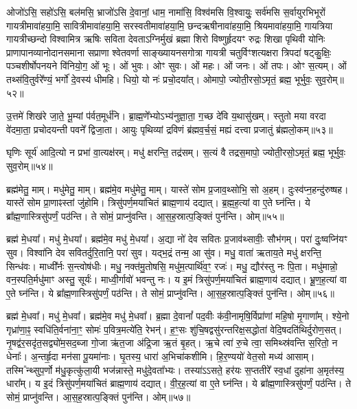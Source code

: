ओजो॑ऽसि॒ सहो॑ऽसि॒ बल॑मसि॒ भ्राजो॑ऽसि दे॒वानां॒ धाम॒ नामा॑सि॒ विश्व॑मसि वि॒श्वायुः॒ सर्व॑मसि स॒र्वायुरभिभूरों गायत्रीमावा॑हया॒मि॒ सावित्रीमावा॑हया॒मि॒ सरस्वतीमावा॑ह\-या॒मि॒ छन्दऋषीनावा॑हया॒मि॒ श्रियमावा॑हया॒मि॒ गायत्रिया गायत्रीच्छन्दो विश्वामित्र ऋषिः सविता देवताऽग्निर्मुखं ब्रह्मा शिरो विष्णुर्\mbox{}हृदयꣳ रुद्रः शिखा पृथिवी योनिः प्राणापानव्यानोदानसमाना सप्राणा श्वेतवर्णा साङ्ख्यायनसगोत्रा गायत्री चतुर्विꣳशत्यक्षरा त्रिपदा॑ षट्कु॒क्षिः॒ पञ्चशीर्\mbox{}षोपनयने वि॑नियो॒ग॒ ओं भूः। 
ओं भुवः। 
ओꣳ सुवः। 
ओं महः। 
ओं जनः। 
ओं तपः। 
ओꣳ स॒त्यम्। 
ओं तथ्स॑वि॒तुर्वरे᳚ण्यं॒ भर्गो॑ दे॒वस्य॑ धीमहि। 
धियो॒ यो नः॑ प्रचो॒दया᳚त्। 
ओमापो॒ ज्योती॒रसो॒ऽमृतं॒ ब्रह्म॒ भूर्भुवः॒ सुव॒रोम्॥५२॥
\anuvakamend

उ॒त्तमे॑ शिख॑रे जा॒ते॒ भू॒म्यां प॑र्वत॒मूर्ध॑नि। 
ब्रा॒ह्म॒णे᳚भ्योऽभ्य॑नु\-ज्ञा॒ता॒ ग॒च्छ दे॑वि य॒थासु॑खम्। 
स्तुतो मया वरदा वे॑दमा॒ता॒ प्रचोदयन्ती पवने᳚ द्विजा॒ता। 
आयुः पृथिव्यां द्रविणं ब्र॑ह्मव॒र्च॒सं॒ मह्यं दत्त्वा प्रजातुं ब्र॑ह्मलो॒कम्॥५३॥
\anuvakamend

घृणिः सूर्य॑ आदि॒त्यो न प्रभा॑ वा॒त्यक्ष॑रम्। 
मधु॑ क्षरन्ति॒ तद्र॑सम्। 
स॒त्यं वै तद्रस॒मापो॒ ज्योती॒रसो॒ऽमृतं॒ ब्रह्म॒ भूर्भुवः॒ सुव॒रोम्॥५४॥\anuvakamend

ब्रह्म॑मेतु॒ माम्। 
मधु॑मेतु॒ माम्। 
ब्रह्म॑मे॒व मधु॑मेतु॒ माम्। 
यास्ते॑ सोम प्र॒जाव॒थ्सोभि॒ सो अ॒हम्। 
दुःस्व॑प्न॒हन्दु॑रुष्षह। 
यास्ते॑ सोम प्रा॒णाꣴस्तां जु॑होमि। 
त्रिसु॑पर्ण॒मया॑चितं ब्राह्म॒णाय॑ दद्यात्। 
ब्र॒ह्म॒ह॒त्यां वा ए॒ते घ्न॑न्ति। 
ये ब्रा᳚ह्म॒णास्त्रिसु॑पर्णं॒ पठ॑न्ति। 
ते सोमं॒ प्राप्नु॑वन्ति। 
आ॒स॒ह॒स्रात्प॒ङ्क्तिं पुन॑न्ति। 
ओम्॥५५॥
\anuvakamend

ब्रह्म॑ मे॒धया᳚। 
मधु॑ मे॒धया᳚। 
ब्रह्म॑मे॒व मधु॑ मे॒धया᳚। 
अ॒द्या नो॑ देव सवितः प्र॒जाव॑थ्सावीः॒ सौभ॑गम्। 
परा॑ दुः॒ष्वप्नि॑यꣳ सुव। 
विश्वा॑नि देव सवितर्दुरि॒तानि॒ परा॑ सुव। 
यद्भ॒द्रं तन्म॒ आ सु॑व। 
मधु॒ वाता॑ ऋताय॒ते मधु॑ क्षरन्ति॒ सिन्ध॑वः। 
माध्वी᳚र्नः स॒न्त्वोष॑धीः। 
मधु॒ नक्त॑मु॒तोषसि॒ मधु॑म॒त्पार्थि॑व॒ꣳ॒ रजः॑। 
मधु॒ द्यौर॑स्तु नः पि॒ता। 
मधु॑मान्नो॒ वन॒स्पति॒र्मधु॑माꣳ अस्तु॒ सूर्यः॑। 
माध्वी॒र्गावो॑ भवन्तु नः। 
य इ॒मं त्रिसु॑पर्ण॒मया॑चितं ब्राह्म॒णाय॑ दद्यात्। 
भ्रू॒ण॒ह॒त्यां वा ए॒ते घ्न॑न्ति। 
ये ब्रा᳚ह्म॒णास्त्रिसु॑पर्णं॒ पठ॑न्ति। 
ते सोमं॒ प्राप्नु॑वन्ति। 
आ॒स॒ह॒स्रात्प॒ङ्क्तिं पुन॑न्ति। 
ओम्॥५६॥
\anuvakamend


ब्रह्म॑ मे॒धवा᳚। 
मधु॑ मे॒धवा᳚। 
ब्रह्म॑मे॒व मधु॑ मे॒धवा᳚। 
ब्र॒ह्मा दे॒वानां᳚ पद॒वीः क॑वी॒नामृषि॒र्विप्रा॑णां महि॒षो मृ॒गाणा᳚म्। 
श्ये॒नो गृध्रा॑णा॒ꣴ॒ स्वधि॑ति॒र्वना॑ना॒ꣳ॒ सोमः॑ प॒वित्र॒मत्ये॑ति॒ रेभन्॑। 
ह॒ꣳ॒सः शु॑चि॒षद्वसु॑रन्तरिक्ष॒सद्धोता॑ वेदि॒षदति॑थिर्दुरोण॒सत्। 
नृ॒षद्व॑र॒सदृ॑त॒सद्व्यो॑म॒सद॒ब्जा गो॒जा ऋ॑त॒जा अ॑द्रि॒जा ऋ॒तं बृ॒हत्। 
ऋ॒चे त्वा॑ रु॒चे त्वा॒ समिथ्स्र॑वन्ति स॒रितो॒ न धेनाः᳚। 
अ॒न्तर्\mbox{}हृ॒दा मन॑सा पू॒यमा॑नाः। 
घृ॒तस्य॒ धारा॑ अ॒भिचा॑कशीमि। 
हि॒र॒ण्ययो॑ वेत॒सो मध्य॑ आसाम्। 
\mbox{तस्मि ᳚\hspace{-1.25ex}न्थ्सु}\-प॒र्णो म॑धु॒कृत्कु॑ला॒यी भज॑न्नास्ते॒ मधु॑\-दे॒वता᳚भ्यः। 
तस्या॑\-ऽऽसते॒ हर॑यः स॒प्ततीरे᳚ स्व॒धां दुहा॑ना अ॒मृत॑स्य॒ धारा᳚म्। 
य इ॒दं त्रिसु॑पर्ण॒मया॑चितं ब्राह्म॒णाय॑ दद्यात्। 
वी॒र॒ह॒त्यां वा ए॒ते घ्न॑न्ति। 
ये ब्रा᳚ह्म॒णास्त्रिसु॑पर्णं॒ पठ॑न्ति। 
ते सोमं॒ प्राप्नु॑वन्ति। 
आ॒स॒ह॒स्रात्प॒ङ्क्तिं पुन॑न्ति। 
ओम्॥५७॥
\anuvakamend

